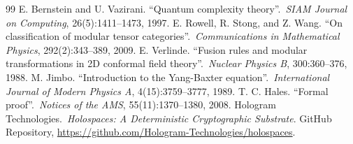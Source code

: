 \begin{thebibliography}{99}
 E. Bernstein and U. Vazirani. ``Quantum complexity theory''.\ \textit{SIAM Journal on Computing}, 26(5):1411--1473, 1997.
 E. Rowell, R. Stong, and Z. Wang. ``On classification of modular tensor categories''.\ \textit{Communications in Mathematical Physics}, 292(2):343--389, 2009.
 E. Verlinde. ``Fusion rules and modular transformations in 2D conformal field theory''.\ \textit{Nuclear Physics B}, 300:360--376, 1988.
 M. Jimbo. ``Introduction to the Yang-Baxter equation''.\ \textit{International Journal of Modern Physics A}, 4(15):3759--3777, 1989.
 T. C. Hales. ``Formal proof''.\ \textit{Notices of the AMS}, 55(11):1370--1380, 2008.
 Hologram Technologies.\ \textit{Holospaces: A Deterministic Cryptographic Substrate}. GitHub Repository, \url{https://github.com/Hologram-Technologies/holospaces}.
\end{thebibliography}

